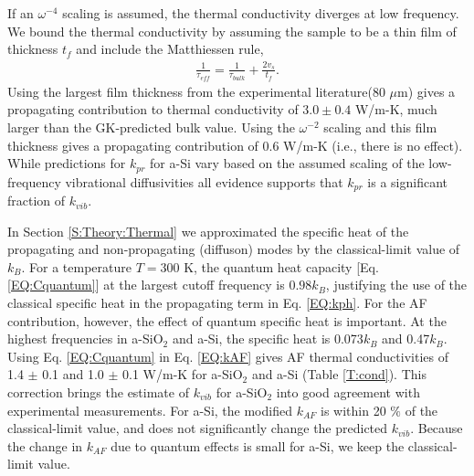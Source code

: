 \documentclass[aps,prb,twocolumn,superscriptaddress,footinbib,amsmath,amssymb,floatfix]{revtex4}
\begin{document}
If an $\omega^{-4}$ scaling is assumed, 
the thermal conductivity diverges at low frequency. We bound the 
thermal conductivity by assuming the sample to be a thin film 
of thickness $t_f$ and include the Matthiessen 
rule,\cite{sellan_cross-plane_2010} 
\begin{equation}\label{EQ:LambdaMatth}
\begin{split}
\frac{1}{\tau_{eff}} = \frac{1}{\tau_{bulk}} + 
\frac{2v_s}{t_f}.
\end{split}
\end{equation}
Using the largest film thickness from the experimental 
literature($80$ $\mu$m)\cite{liu_high_2009} 
gives a propagating contribution 
to thermal conductivity of $3.0 \pm 0.4$ W/m-K, much larger than the 
GK-predicted bulk value. 
Using the $\omega^{-2}$ scaling and this film thickness 
gives a propagating contribution of 0.6 W/m-K (i.e., there is 
no effect). 
While predictions for $k_{pr}$ for a-Si  
vary based on the assumed scaling of the low-frequency 
vibrational diffusivities
\cite{feldman_thermal_1993,cahill_thermal_1994,
feldman_numerical_1999,liu_high_2009,yang_anomalously_2010,
he_heat_2011} 
all evidence supports that $k_{pr}$ is a significant fraction 
of $k_{vib}$.
\cite{feldman_thermal_1993,cahill_thermal_1994,
feldman_numerical_1999,liu_high_2009,
yang_anomalously_2010,
he_heat_2011,regner_broadband_2013}

In Section \ref{S:Theory:Thermal} we approximated the specific heat 
of the propagating 
and non-propagating (diffuson) modes by the classical-limit 
value of $k_{B}$. For a temperature $T=300$ K, the quantum 
heat capacity [Eq. \eqref{EQ:Cquantum}] 
at the largest cutoff frequency is $0.98 k_{B}$, justifying the 
use of the classical specific heat in the propagating term 
in Eq. \eqref{EQ:kph}. For the AF contribution, however, the 
effect of quantum specific heat is important. At the highest 
frequencies in a-SiO$_2$ and a-Si, the specific heat is 
0.073$k_{B}$ and 0.47$k_{B}$. Using Eq. \eqref{EQ:Cquantum} 
in Eq. \eqref{EQ:kAF} gives AF thermal conductivities of 
1.4 $\pm$ 0.1 and 
1.0 $\pm$ 0.1 W/m-K for a-SiO$_2$ and a-Si (Table \ref{T:cond}). 
This correction brings the estimate of $k_{vib}$ for 
a-SiO$_2$ into good agreement with experimental measurements.
\cite{cahill_lattice_1988,lee_heat_1997,
yamane_measurement_2002,regner_broadband_2013} 
For a-Si, the modified $k_{AF}$ is within 20 $\%$ of the 
classical-limit value, 
and does not significantly change the predicted $k_{vib}$. 
Because the change in $k_{AF}$ due to quantum effects is 
small for a-Si, 
we keep the classical-limit value.  
\end{document}

